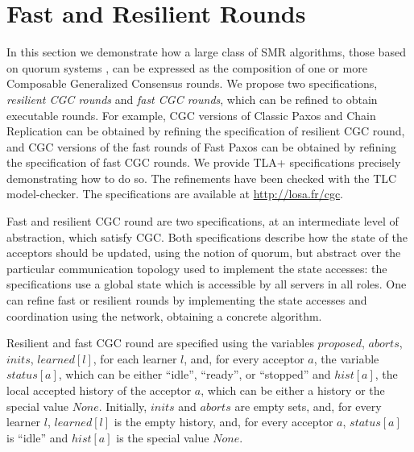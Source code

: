 \section{Fast and Resilient Rounds}
\label{sec:rounds}

In this section we demonstrate how a large class of SMR algorithms, those based on quorum systems \cite{GuerraouiVukolic10RefinedQuorumSystems}, can be expressed as the composition of one or more Composable Generalized Consensus rounds. 
We propose two specifications, \emph{resilient CGC
rounds} and \emph{fast CGC rounds}, which can be refined to obtain executable rounds.
For example, CGC versions of Classic Paxos and Chain
Replication can be obtained by refining the specification of
resilient CGC round, and CGC versions of the fast rounds of Fast Paxos can be obtained by refining the specification of fast CGC rounds.
We provide TLA+ specifications precisely demonstrating how to do so. The refinements have been checked with the TLC model-checker.
The specifications are available at \url{http://losa.fr/cgc}.

Fast and resilient CGC round are two specifications, at an
intermediate level of abstraction, which satisfy CGC. Both
specifications describe how the state of the acceptors should be
updated, using the notion of quorum, but abstract over the particular communication topology used
to implement the state accesses: the specifications use a global state
which is accessible by all servers in all roles. One can refine fast
or resilient rounds by implementing the state accesses and coordination
using the network, obtaining a concrete algorithm.

Resilient and fast CGC round are specified using the variables $proposed$, $aborts$, $inits$, $learned\left[ l \right]$, for each learner $l$, 
and, for every acceptor $a$, the variable
$status\left[ a \right]$, which can be either ``idle'', ``ready'', or
``stopped'' and $hist\left[ a \right]$, the local accepted history of the
acceptor $a$, which can be either a history or the special value $None$.
Initially, $inits$ and $aborts$ are empty sets, and, for every learner
$l$, $learned\left[ l \right]$ is the empty history, and, for every acceptor $a$,
$status\left[ a \right]$  is ``idle'' and $hist\left[ a \right]$ is the special
value $None$.

